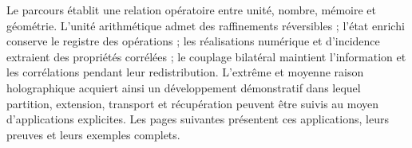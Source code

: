 Le parcours établit une relation opératoire entre unité, nombre, mémoire et géométrie. L'unité arithmétique admet des raffinements réversibles ; l'état enrichi conserve le registre des opérations ; les réalisations numérique et d'incidence extraient des propriétés corrélées ; le couplage bilatéral maintient l'information et les corrélations pendant leur redistribution. L'extrême et moyenne raison holographique acquiert ainsi un développement démonstratif dans lequel partition, extension, transport et récupération peuvent être suivis au moyen d'applications explicites. Les pages suivantes présentent ces applications, leurs preuves et leurs exemples complets.
